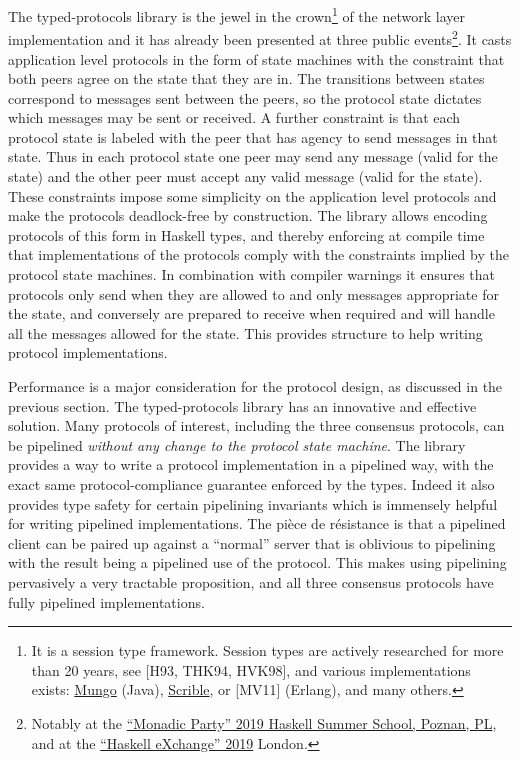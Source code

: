 \documentclass[11pt,a4paper]{article}
\begin{document}
The typed-protocols library is the jewel in the crown\footnote{It is a
  session type framework. Session types are actively researched for more
  than 20 years, see {[}H93, THK94, HVK98{]}, and various
  implementations exists:
  \href{http://www.dcs.gla.ac.uk/research/mungo/}{{Mungo}} (Java),
  \href{http://www.scrible.org}{{Scrible}}, or {[}MV11{]} (Erlang), and
  many others.} of the network layer implementation and it has already
been presented at three public events\footnote{Notably at the
  \href{https://monadic.party/\#talks}{``Monadic Party'' 2019 Haskell
  Summer School, Poznan, PL}, and at the
  \href{https://skillsmatter.com/conferences/11741-haskell-exchange-2019\#program}{{``Haskell
  eXchange'' 2019}} London.}. It casts application level protocols in
the form of state machines with the constraint that both peers agree on
the state that they are in. The transitions between states correspond to
messages sent between the peers, so the protocol state dictates which
messages may be sent or received. A further constraint is that each
protocol state is labeled with the peer that has agency to send messages
in that state. Thus in each protocol state one peer may send any message
(valid for the state) and the other peer must accept any valid message
(valid for the state). These constraints impose some simplicity on the
application level protocols and make the protocols deadlock-free by
construction. The library allows encoding protocols of this form in
Haskell types, and thereby enforcing at compile time that
implementations of the protocols comply with the constraints implied by
the protocol state machines. In combination with compiler warnings it
ensures that protocols only send when they are allowed to and only
messages appropriate for the state, and conversely are prepared to
receive when required and will handle all the messages allowed for the
state. This provides structure to help writing protocol implementations.

Performance is a major consideration for the protocol design, as
discussed in the previous section. The typed-protocols library has an
innovative and effective solution. Many protocols of interest, including
the three consensus protocols, can be pipelined \emph{without any change
to the protocol state machine}. The library provides a way to write a
protocol implementation in a pipelined way, with the exact same
protocol-compliance guarantee enforced by the types. Indeed it also
provides type safety for certain pipelining invariants which is
immensely helpful for writing pipelined implementations. The pièce de
résistance is that a pipelined client can be paired up against a
``normal'' server that is oblivious to pipelining with the result being
a pipelined use of the protocol. This makes using pipelining pervasively
a very tractable proposition, and all three consensus protocols have
fully pipelined implementations.
\end{document}
